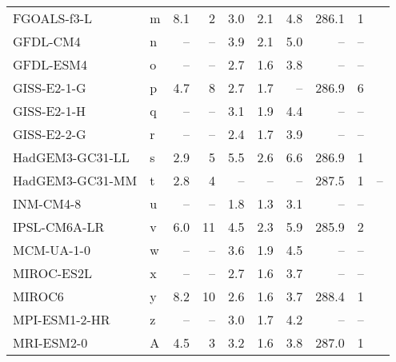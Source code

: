 \begin{table}
\begin{tabular}{llrrrrrrrl}
FGOALS-f3-L     &   m &   8.1 &                       2 &  3.0 &  2.1 &   4.8 &  286.1 &                      1 &  \citet{ringer20cmip} \\
GFDL-CM4        &   n &    -- &                    -- &  3.9 &  2.1 &   5.0 &     -- &                   -- &  \citet{ringer20cmip} \\
GFDL-ESM4       &   o &    -- &                    -- &  2.7 &  1.6 &   3.8 &     -- &                   -- &  \citet{ringer20cmip} \\
GISS-E2-1-G     &   p &   4.7 &                       8 &  2.7 &  1.7 &    -- &  286.9 &                      6 &  \citet{ringer20cmip} \\
GISS-E2-1-H     &   q &    -- &                    -- &  3.1 &  1.9 &   4.4 &     -- &                   -- &  \citet{ringer20cmip} \\
GISS-E2-2-G     &   r &    -- &                    -- &  2.4 &  1.7 &   3.9 &     -- &                   -- &  \citet{ringer20cmip} \\
HadGEM3-GC31-LL &   s &   2.9 &                       5 &  5.5 &  2.6 &   6.6 &  286.9 &                      1 &  \citet{ringer20cmip} \\
HadGEM3-GC31-MM &   t &   2.8 &                       4 &   -- &   -- &    -- &  287.5 &                      1 &                    -- \\
INM-CM4-8       &   u &    -- &                    -- &  1.8 &  1.3 &   3.1 &     -- &                   -- &  \citet{ringer20cmip} \\
IPSL-CM6A-LR    &   v &   6.0 &                      11 &  4.5 &  2.3 &   5.9 &  285.9 &                      2 &  \citet{ringer20cmip} \\
MCM-UA-1-0      &   w &    -- &                    -- &  3.6 &  1.9 &   4.5 &     -- &                   -- &  \citet{ringer20cmip} \\
MIROC-ES2L      &   x &    -- &                    -- &  2.7 &  1.6 &   3.7 &     -- &                   -- &  \citet{ringer20cmip} \\
MIROC6          &   y &   8.2 &                      10 &  2.6 &  1.6 &   3.7 &  288.4 &                      1 &  \citet{ringer20cmip} \\
MPI-ESM1-2-HR   &   z &    -- &                    -- &  3.0 &  1.7 &   4.2 &     -- &                   -- &  \citet{ringer20cmip} \\
MRI-ESM2-0      &   A &   4.5 &                       3 &  3.2 &  1.6 &   3.8 &  287.0 &                      1 &  \citet{ringer20cmip} \\

\end{tabular}
\end{table}
